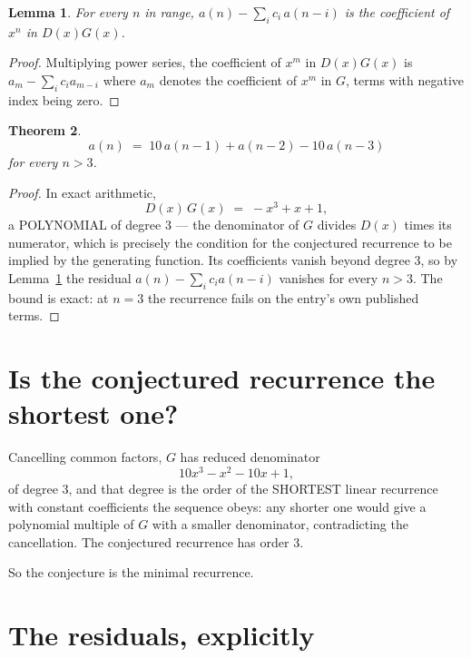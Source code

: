 \documentclass[11pt,a4paper]{article}
\theoremstyle{plain}
\newtheorem{theorem}{Theorem}
\newtheorem{lemma}[theorem]{Lemma}
\theoremstyle{definition}
\begin{document}
\begin{lemma}\label{lem:key}
For every $n$ in range, $a(n)-\sum_i c_i\,a(n-i)$ is the coefficient of $x^{n}$ in
$D(x)G(x)$.
\end{lemma}

\begin{proof}
Multiplying power series, the coefficient of $x^{m}$ in $D(x)G(x)$ is
$a_m-\sum_i c_i a_{m-i}$ where $a_m$ denotes the coefficient of $x^{m}$ in $G$, terms with
negative index being zero.
\end{proof}

\begin{theorem}
\[
a(n)\;=\;10\,a(n-1) + a(n-2) - 10\,a(n-3)
\]
for every $n>3$.
\end{theorem}

\begin{proof}
In exact arithmetic,
\[
D(x)\,G(x)\;=\;- x^{3} + x + 1,
\]
a POLYNOMIAL of degree $3$ --- the denominator of $G$ divides $D(x)$ times its numerator,
which is precisely the condition for the conjectured recurrence to be implied by the
generating function. Its coefficients vanish beyond degree $3$, so by
Lemma~\ref{lem:key} the residual $a(n)-\sum_ic_ia(n-i)$ vanishes for every
$n>3$. The bound is exact: at $n=3$ the recurrence fails on the entry's own published terms.
\end{proof}

\section{Is the conjectured recurrence the shortest one?}

Cancelling common factors, $G$ has reduced denominator
\[
10 x^{3} - x^{2} - 10 x + 1,
\]
of degree $3$, and that degree is the order of the SHORTEST linear recurrence with
constant coefficients the sequence obeys: any shorter one would give a polynomial multiple of
$G$ with a smaller denominator, contradicting the cancellation. The conjectured recurrence has
order $3$.

So the conjecture is the minimal recurrence.

\section{The residuals, explicitly}
\end{document}
